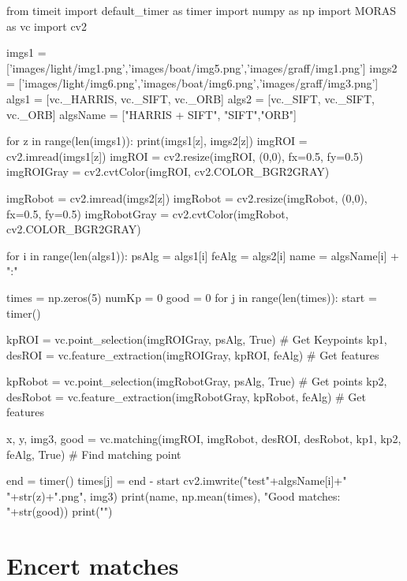 \begin{python}
from timeit import default_timer as timer
import numpy as np
import MORAS as vc
import cv2

imgs1 = ['images/light/img1.png','images/boat/img5.png','images/graff/img1.png']
imgs2 = ['images/light/img6.png','images/boat/img6.png','images/graff/img3.png']
algs1 = [vc._HARRIS, vc._SIFT, vc._ORB]
algs2 = [vc._SIFT, vc._SIFT, vc._ORB]
algsName = ["HARRIS + SIFT", "SIFT","ORB"]

for z in range(len(imgs1)):
	print(imgs1[z], imgs2[z])
	imgROI = cv2.imread(imgs1[z])
	imgROI = cv2.resize(imgROI, (0,0), fx=0.5, fy=0.5)
	imgROIGray = cv2.cvtColor(imgROI, cv2.COLOR_BGR2GRAY)

	imgRobot = cv2.imread(imgs2[z])
	imgRobot = cv2.resize(imgRobot, (0,0), fx=0.5, fy=0.5)
	imgRobotGray = cv2.cvtColor(imgRobot, cv2.COLOR_BGR2GRAY)

	for i in range(len(algs1)):
		psAlg = algs1[i]
		feAlg = algs2[i]
		name = algsName[i] + ":"
		
		times = np.zeros(5)
		numKp = 0
		good = 0
		for j in range(len(times)):
			start = timer()

			kpROI = vc.point_selection(imgROIGray, psAlg, True)				# Get Keypoints
			kp1, desROI = vc.feature_extraction(imgROIGray, kpROI, feAlg)	# Get features

			kpRobot = vc.point_selection(imgRobotGray, psAlg, True)					# Get points
			kp2, desRobot = vc.feature_extraction(imgRobotGray, kpRobot, feAlg)	# Get features

			x, y, img3, good = vc.matching(imgROI, imgRobot, desROI, desRobot, kp1, kp2, feAlg, True)	# Find matching point

			end = timer()
			times[j] = end - start
		cv2.imwrite("test"+algsName[i]+" "+str(z)+".png", img3)
		print(name, np.mean(times), "Good matches: "+str(good))
	print("\n")
\end{python}

\section{Encert matches}

